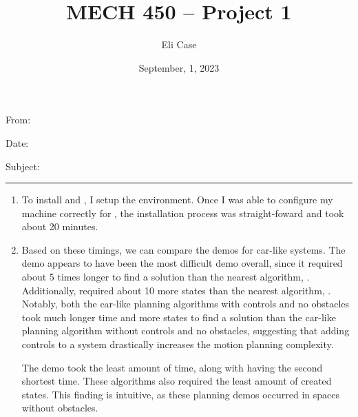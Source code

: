 \documentclass[11pt]{article}
\author{Eli Case}
\title{MECH 450 -- Project 1}
\date{September, 1, 2023}
\newcommand{\forceindent}{\leavevmode{\parindent=1em\indent}}
\begin{document}
\flushleft
\thispagestyle{plain}

From: \@author

Date: \@date

Subject: \@title

\makeatother
\medskip
\hrule
\medskip

\begin{enumerate}[leftmargin=0.3in]

   \item %

   \begin{enumerate}[leftmargin=0.3in]
      \forceindent To install  and , I setup the  environment. Once I was able to configure my machine correctly for , the installation process was straight-foward and took about 20 minutes.
   \end{enumerate} %

   \item %
   \begin{enumerate}[leftmargin=0.3in]
   
    \forceindent Based on these timings, we can compare the demos for car-like systems. The  demo appears to have been the most difficult demo overall, since it required about 5 times longer to find a solution than the nearest algorithm, . Additionally,  required about 10 more states than the nearest algorithm,  . Notably, both the car-like planning algorithms with controls and no obstacles took much longer time and more states to find a solution than the car-like planning algorithm without controls and no obstacles, suggesting that adding controls to a system drastically increases the motion planning complexity.

    \forceindent The  demo took the least amount of time, along with  having the second shortest time. These algorithms also required the least amount of created states. This finding is intuitive, as these planning demos occurred in spaces without obstacles.


\end{enumerate}
\end{enumerate}
\end{document}
